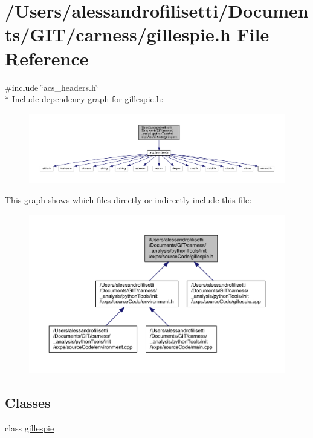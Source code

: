 \hypertarget{a00067}{\section{/\-Users/alessandrofilisetti/\-Documents/\-G\-I\-T/carness/gillespie.h File Reference}
\label{a00067}
}
{\ttfamily \#include \char`\"{}acs\-\_\-headers.\-h\char`\"{}}\\*
Include dependency graph for gillespie.\-h\-:
\nopagebreak
\begin{figure}[H]
\begin{center}
\leavevmode
\includegraphics[width=350pt]{a00186}
\end{center}
\end{figure}
This graph shows which files directly or indirectly include this file\-:
\nopagebreak
\begin{figure}[H]
\begin{center}
\leavevmode
\includegraphics[width=350pt]{a00187}
\end{center}
\end{figure}
\subsection*{Classes}
\begin{DoxyCompactItemize}
\item 
class \hyperlink{a00015}{gillespie}
\end{DoxyCompactItemize}
